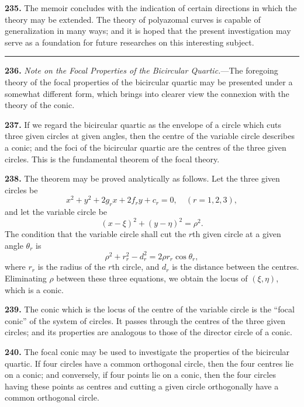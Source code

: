 \documentclass[12pt,a4paper]{article}
\theoremstyle{definition}
\begin{document}
\newpage
\noindent\textbf{235.} The memoir concludes with the indication of certain directions in which
the theory may be extended. The theory of polyazomal curves is capable of generalization
in many ways; and it is hoped that the present investigation may serve as a
foundation for future researches on this interesting subject.

\vspace{1em}
\begin{center}
\rule{0.5\textwidth}{0.4pt}
\end{center}
\vspace{1em}

\noindent\textbf{236.} \textit{Note on the Focal Properties of the Bicircular Quartic.}---The foregoing
theory of the focal properties of the bicircular quartic may be presented under a
somewhat different form, which brings into clearer view the connexion with the theory
of the conic.

\noindent\textbf{237.} If we regard the bicircular quartic as the envelope of a circle which cuts
three given circles at given angles, then the centre of the variable circle describes a
conic; and the foci of the bicircular quartic are the centres of the three given circles.
This is the fundamental theorem of the focal theory.

\noindent\textbf{238.} The theorem may be proved analytically as follows. Let the three given
circles be
\[
x^2 + y^2 + 2g_rx + 2f_ry + c_r = 0, \quad (r = 1, 2, 3),
\]
and let the variable circle be
\[
(x - \xi)^2 + (y - \eta)^2 = \rho^2.
\]
The condition that the variable circle shall cut the $r$th given circle at a given angle
$\theta_r$ is
\[
\rho^2 + r_r^2 - d_r^2 = 2\rho r_r\cos\theta_r,
\]
where $r_r$ is the radius of the $r$th circle, and $d_r$ is the distance between the centres.
Eliminating $\rho$ between these three equations, we obtain the locus of $(\xi, \eta)$, which is a conic.

\newpage
\noindent\textbf{239.} The conic which is the locus of the centre of the variable circle is the
``focal conic'' of the system of circles. It passes through the centres of the three
given circles; and its properties are analogous to those of the director circle of a conic.

\noindent\textbf{240.} The focal conic may be used to investigate the properties of the bicircular
quartic. If four circles have a common orthogonal circle, then the four centres lie on
a conic; and conversely, if four points lie on a conic, then the four circles having these
points as centres and cutting a given circle orthogonally have a common orthogonal circle.
\end{document}
